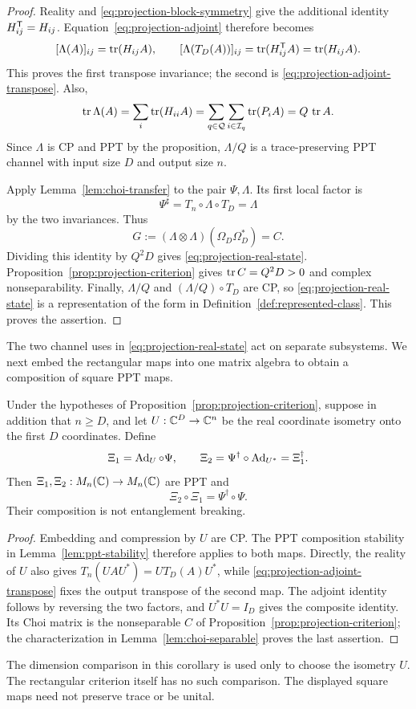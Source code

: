 \begin{proof}
Reality and \eqref{eq:projection-block-symmetry} give the additional
identity \(H_{ij}^{\mathsf T}=H_{ij}\).  Equation~\eqref{eq:projection-adjoint}
therefore becomes
\[
 [\Lambda(A)]_{ij}=\operatorname{tr}(H_{ij}A),\qquad
 [\Lambda(T_D(A))]_{ij}=\operatorname{tr}(H_{ij}^{\mathsf T}A)=\operatorname{tr}(H_{ij}A).
\]
This proves the first transpose invariance; the second is
\eqref{eq:projection-adjoint-transpose}.  Also,
\[
 \operatorname{tr}\Lambda(A)=\sum_i\operatorname{tr}(H_{ii}A)
 =\sum_{q\in\mathcal Q}\sum_{i\in\mathcal I_q}\operatorname{tr}(P_iA)
 =Q\,\operatorname{tr} A.
\]
Since \(\Lambda\) is CP and PPT by the proposition, \(\Lambda/Q\)
is a trace-preserving PPT channel with input size \(D\) and output
size \(n\).

Apply Lemma~\ref{lem:choi-transfer} to the pair \(\Psi,\Lambda\).
Its first local factor is
\[
 \Psi^\sharp=T_n\circ\Lambda\circ T_D=\Lambda
\]
by the two invariances.  Thus
\begin{equation}\label{eq:projection-real-identification}
 G:=(\Lambda\otimes\Lambda)(\Omega_D\Omega_D^*)=C.
\end{equation}
Dividing this identity by \(Q^2D\) gives
\eqref{eq:projection-real-state}.  Proposition~\ref{prop:projection-criterion}
gives \(\operatorname{tr} C=Q^2D>0\) and complex nonseparability.  Finally,
\(\Lambda/Q\) and \((\Lambda/Q)\circ T_D\) are CP, so
\eqref{eq:projection-real-state} is a representation of the form in
Definition~\ref{def:represented-class}.  This proves the assertion.
\end{proof}

The two channel uses in \eqref{eq:projection-real-state} act on separate
subsystems.  We next embed the rectangular maps into one matrix algebra
to obtain a composition of square PPT maps.

\begin{corollary}\label{cor:square-embedding}
Under the hypotheses of Proposition~\ref{prop:projection-criterion},
suppose in addition that \(n\geq D\), and let
\(U:\mathbb C^D\to\mathbb C^n\) be the real coordinate isometry onto the first
\(D\) coordinates.  Define
\begin{equation}\label{eq:projection-square-pair}
 \Xi_1=\operatorname{Ad}_U\circ\Psi,\qquad
 \Xi_2=\Psi^\dagger\circ\operatorname{Ad}_{U^*}
       =\Xi_1^\dagger .
\end{equation}
Then \(\Xi_1,\Xi_2:M_{n}(\mathbb C)\to M_{n}(\mathbb C)\) are PPT and
\[
 \Xi_2\circ\Xi_1=\Psi^\dagger\circ\Psi.
\]
Their composition is not entanglement breaking.
\end{corollary}

\begin{proof}
Embedding and compression by \(U\) are CP.  The PPT composition
stability in Lemma~\ref{lem:ppt-stability} therefore applies to both
maps.  Directly, the reality of \(U\) also gives
\(T_n(UAU^*)=U T_D(A)U^*\), while
\eqref{eq:projection-adjoint-transpose} fixes the output transpose of
the second map.  The adjoint identity follows by reversing the two
factors, and \(U^*U=I_D\) gives the composite identity.  Its Choi
matrix is the nonseparable \(C\) of
Proposition~\ref{prop:projection-criterion}; the characterization in
Lemma~\ref{lem:choi-separable} proves the last assertion.
\end{proof}

The dimension comparison in this corollary is used only to choose
the isometry \(U\).  The rectangular criterion itself has no such
comparison.  The displayed square maps need not preserve trace or be
unital.
